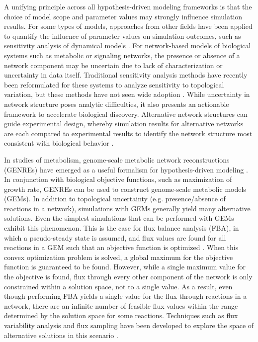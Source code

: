 \documentclass[11pt,onecolumn,notitlepage,openany,twoside]{book}
\begin{document}
\begin{refsection}
A unifying principle across all hypothesis-driven modeling frameworks is that the choice of model scope and parameter values may strongly influence simulation results. For some types of models, approaches from other fields have been applied to quantify the influence of parameter values on simulation outcomes, such as sensitivity analysis of dynamical models \cite{Marino2008-jt}. For network-based models of biological systems such as metabolic or signaling networks, the presence or absence of a network component may be uncertain due to lack of characterization or uncertainty in data itself. Traditional sensitivity analysis methods have recently been reformulated for these systems to analyze sensitivity to topological variation, but these methods have not seen wide adoption \cite{Babtie2014-vy}. While uncertainty in network structure poses analytic difficulties, it also presents an actionable framework to accelerate biological discovery. Alternative network structures can guide experimental design, whereby simulation results for alternative networks are each compared to experimental results to identify the network structure most consistent with biological behavior \cite{Medlock2018-kx,Silk2014-rv}.

In studies of metabolism, genome-scale metabolic network reconstructions (GENREs) have emerged as a useful formalism for hypothesis-driven modeling \cite{Oberhardt2009-iu}. In conjunction with biological objective functions, such as maximization of growth rate, GENREs can be used to construct genome-scale metabolic models (GEMs). In addition to topological uncertainty (e.g. presence/absence of reactions in a network), simulations with GEMs generally yield many alternative solutions. Even the simplest simulations that can be performed with GEMs exhibit this phenomenon. This is the case for flux balance analysis (FBA), in which a pseudo-steady state is assumed, and flux values are found for all reactions in a GEM such that an objective function is optimized \cite{Orth2010-kl}. When this convex optimization problem is solved, a global maximum for the objective function is guaranteed to be found. However, while a single maximum value for the objective is found, flux through every other component of the network is only constrained within a solution space, not to a single value. As a result, even though performing FBA yields a single value for the flux through reactions in a network, there are an infinite number of feasible flux values within the range determined by the solution space for some reactions. Techniques such as flux variability analysis and flux sampling have been developed to explore the space of alternative solutions in this scenario \cite{Mahadevan2003-ah,Schellenberger2009-bj}.


\end{refsection}
\end{document}
